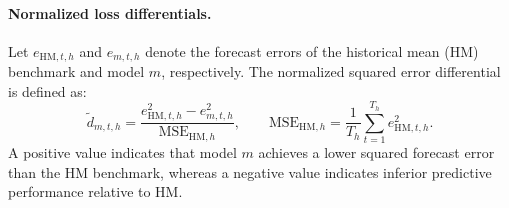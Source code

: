 \documentclass[runningheads,orivec]{llncs}
\begin{document}
\paragraph{Normalized loss differentials.} Let $e_{\mathrm{HM},t,h}$ and $e_{m,t,h}$ denote the forecast errors of the historical mean (HM) benchmark and model $m$, respectively. The normalized squared error differential is defined as:
\begin{equation}\label{eq:norm_loss_diff}
\widetilde d_{m,t,h}
=
\frac{e^2_{\mathrm{HM},t,h}-e^2_{m,t,h}}
{\mathrm{MSE}_{\mathrm{HM},h}},
\qquad
\mathrm{MSE}_{\mathrm{HM},h}
=
\frac{1}{T_h}\sum_{t=1}^{T_h}e^2_{\mathrm{HM},t,h}.
\end{equation}
A positive value indicates that model $m$ achieves a lower squared forecast error than the HM benchmark, whereas a negative value indicates inferior predictive performance relative to HM.
\end{document}
